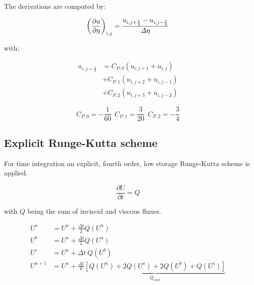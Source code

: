 The derivations are computed by:

\begin{equation}
\left( \frac{\partial u}{\partial \eta}\right)_{i,j}=\frac{u_{i,j+\frac{1}{2}}-u_{i,j-\frac{1}{2}}}{\varDelta \eta}\\
\end{equation}

with:

\begin{eqnarray}
u_{i,j+\frac{1}{2}}&=
C_{P,0}\left(u_{i,j+1}+u_{i,j} \right)\\ \nonumber
&+C_{P,1}\left(u_{i,j+2}+u_{i,j-1} \right)\\ \nonumber
&+C_{P,2}\left(u_{i,j+3}+u_{i,j-2} \right)
\end{eqnarray}

\begin{equation}
C_{P,0}=-\frac{1}{60}\ \ 
C_{P,1}=\frac{3}{20}\ \ 
C_{P,2}=-\frac{3}{4}
\end{equation}

\subsection{Explicit Runge-Kutta scheme}
For time integration an explicit, fourth order, low storage Runge-Kutta scheme is applied.

\begin{equation}
\frac{\partial U}{\partial t}=Q
\end{equation}

with $Q$ being the sum of inviscid and viscous fluxes.

\begin{eqnarray}
U^{a}&= U^{n}+ \frac{\varDelta t}{2} Q\left(U^{n}\right)\\
U^{b}&=U^{n}+ \frac{\varDelta t}{2} Q\left(U^{a}\right)\\
U^{c}&=U^{n}+ \varDelta t\ Q\left(U^{b}\right)\\
U^{n+1}&=U^{n}+\frac{\varDelta t}{6} \underbrace{ \left[Q\left(U^{n}\right)+2 Q\left(U^{a}\right)+2 Q\left(U^{b}\right)+Q\left(U^{c}\right)\right]}_{Q_{sum}}
\end{eqnarray}